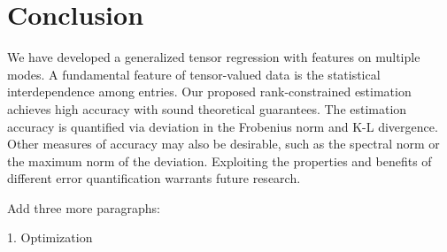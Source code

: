 \documentclass[12pt]{article}
\theoremstyle{plain}
\theoremstyle{definition}
\begin{document}
\section{Conclusion}\label{sec:con}

We have developed a generalized tensor regression with features on multiple modes. A fundamental feature of tensor-valued data is the statistical interdependence among entries. Our proposed rank-constrained estimation achieves high accuracy with sound theoretical guarantees. The estimation accuracy is quantified via deviation in the Frobenius norm and K-L divergence. Other measures of accuracy may also be desirable, such as the spectral norm or the maximum norm of the deviation. Exploiting the properties and benefits of different error quantification warrants future research.
 
 Add three more paragraphs: 
 
 1. Optimization 

\end{document}
